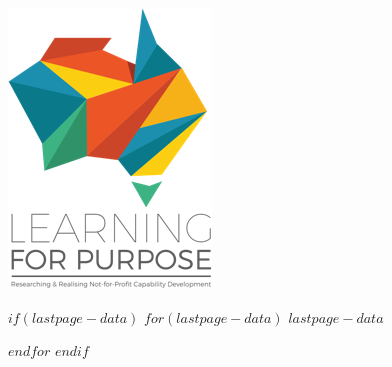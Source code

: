 \documentclass[11pt, a4paper]{article}
\begin{document}
{
	\thispagestyle{empty}
	\centering
	\includegraphics[width=.75\textwidth]{www/LFP_vertical_tagline.png}
	\setlength{\parskip}{.5ex}
	
	\vfill

	\footnotesize
	$if(lastpage-data)$
		$for(lastpage-data)$
			$lastpage-data$ \par
		$endfor$
	$endif$
}
\end{document}
